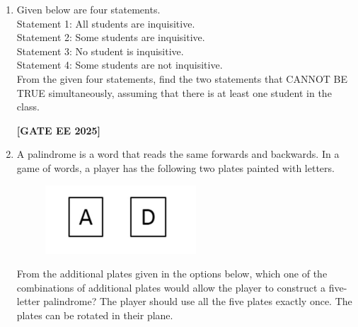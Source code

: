 \documentclass[journal]{IEEEtran}
\newcommand{\qfooter}{%
  \begin{flushright}\footnotesize\textbf{[GATE EE 2025]}\end{flushright}\vspace{1em}%
}
\begin{document}
\begin{enumerate}
\item Given below are four statements.\\
Statement 1: All students are inquisitive.\\
Statement 2: Some students are inquisitive.\\
Statement 3: No student is inquisitive.\\
Statement 4: Some students are not inquisitive.\\
From the given four statements, find the two statements that CANNOT BE TRUE simultaneously, assuming that there is at least one student in the class.
\begin{enumerate}
\qfooter
\end{enumerate}

\item A palindrome is a word that reads the same forwards and backwards. In a game 
of words, a player has the following two plates painted with letters.

\begin{figure}[h]
\centering
\includegraphics[width=0.38\columnwidth]{figs/q5.png}
\end{figure}

From the additional plates given in the options below, which one of the combinations 
of additional plates would allow the player to construct a five-letter palindrome? 
The player should use all the five plates exactly once. The plates can be rotated 
in their plane.


\end{enumerate}
\end{document}
